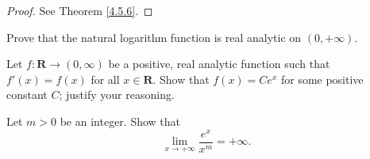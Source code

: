 \begin{proof}
    See Theorem \ref{4.5.6}.
\end{proof}

\begin{exercise}\label{ex 4.5.6}
    Prove that the natural logarithm function is real analytic on \((0, +\infty)\).
\end{exercise}

\begin{exercise}\label{ex 4.5.7}
    Let \(f : \mathbf{R} \to (0, \infty)\) be a positive, real analytic function such that \(f'(x) = f(x)\) for all \(x \in \mathbf{R}\).
    Show that \(f(x) = C e^x\) for some positive constant \(C\);
    justify your reasoning.
\end{exercise}

\begin{exercise}\label{ex 4.5.8}
    Let \(m > 0\) be an integer.
    Show that
    \[
        \lim_{x \to +\infty} \frac{e^x}{x^m} = +\infty.
    \]
\end{exercise}

